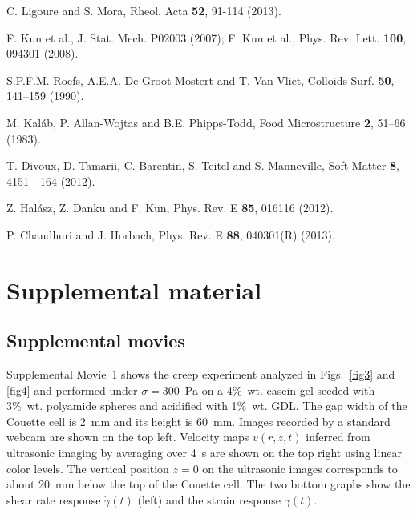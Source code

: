 \documentclass[twocolumn,superscriptaddress,showpacs,preprintnumbers,amsmath,amssymb,prl]{revtex4}
\newcommand\gp{\dot\gamma}
\begin{document}
\begin{thebibliography}{}
 C. Ligoure and S. Mora, Rheol. Acta {\bf 52}, 91-114 (2013).

 F. Kun et al., J. Stat. Mech. P02003 (2007); F. Kun et al., Phys. Rev. Lett. {\bf 100}, 094301 (2008).

 S.P.F.M. Roefs, A.E.A. De Groot-Mostert and T. Van Vliet, Colloids Surf. {\bf 50}, 141--159 (1990).

 M. Kal\'ab, P. Allan-Wojtas and B.E. Phipps-Todd, Food Microstructure {\bf 2}, 51--66 (1983).

 T. Divoux, D. Tamarii, C. Barentin, S. Teitel and S. Manneville, Soft Matter {\bf 8}, 4151---164 (2012).

 Z. Hal\'asz, Z. Danku and F. Kun, Phys. Rev. E {\bf 85}, 016116 (2012).



 P. Chaudhuri and J. Horbach, Phys. Rev. E {\bf 88}, 040301(R) (2013).


\end{thebibliography}


\clearpage
\newpage
\setcounter{figure}{0}

\section*{\large Supplemental material}

\subsection*{Supplemental movies}

Supplemental Movie~1 shows the creep experiment analyzed in Figs.~\ref{fig3} and \ref{fig4} and performed under $\sigma=300$~Pa on a 4\%~wt. casein gel seeded with 3\%~wt. polyamide spheres and acidified with 1\%~wt. GDL. The gap width of the Couette cell is 2~mm and its height is 60~mm. Images recorded by a standard webcam are shown on the top left. Velocity maps $v(r,z,t)$ inferred from ultrasonic imaging by averaging over 4~s are shown on the top right using linear color levels. The vertical position $z=0$ on the ultrasonic images corresponds to about 20~mm below the top of the Couette cell. The two bottom graphs show the shear rate response $\gp(t)$ (left) and the strain response $\gamma(t)$.
\end{document}
